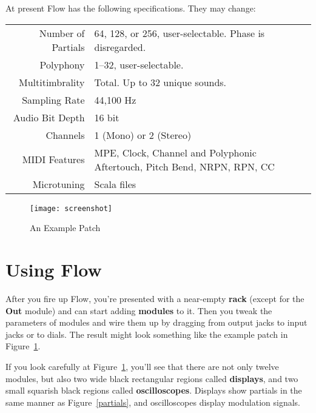 \documentclass{article}
\newcommand\bump{\vspace{20in}}
\newcommand\name{Flow}
\begin{document}
At present {\name} has the following specifications.  They may change:

\begin{center}
\begin{tabular}{rl}
Number of Partials&64, 128, or 256, user-selectable.  Phase is disregarded.\\
Polyphony&1--32, user-selectable.\\
Multitimbrality&Total.  Up to 32 unique sounds.\\
Sampling Rate&44,100 Hz\\
Audio Bit Depth&16 bit\\
Channels&1 (Mono) or 2 (Stereo)\\
MIDI Features&MPE, Clock, Channel and Polyphonic Aftertouch, Pitch Bend, NRPN, RPN, CC\\
Microtuning&Scala files
\end{tabular}
\end{center}


\bump

\begin{figure}[t]
\begin{center}\texttt{[image: screenshot]}\end{center}
\vspace{-3em}
\caption{An Example Patch}
\label{screenshot}
\end{figure}


\section{Using {\name}}

After you fire up {\name}, you're presented with a near-empty {\bf rack} (except for the {\bf Out} module) and can start adding {\bf modules} to it.  Then you tweak the parameters of modules and wire them up by dragging from output jacks to input jacks or to dials.  The result might look something like the example patch in Figure~\ref{screenshot}.

If you look carefully at Figure~\ref{screenshot}, you'll see that there are not only twelve modules, but also two wide black rectangular regions called {\bf displays}, and two small squarish black regions called {\bf oscilloscopes}.  Displays show partials in the same manner as Figure~\ref{partials}, and oscilloscopes display modulation signals.
\end{document}
